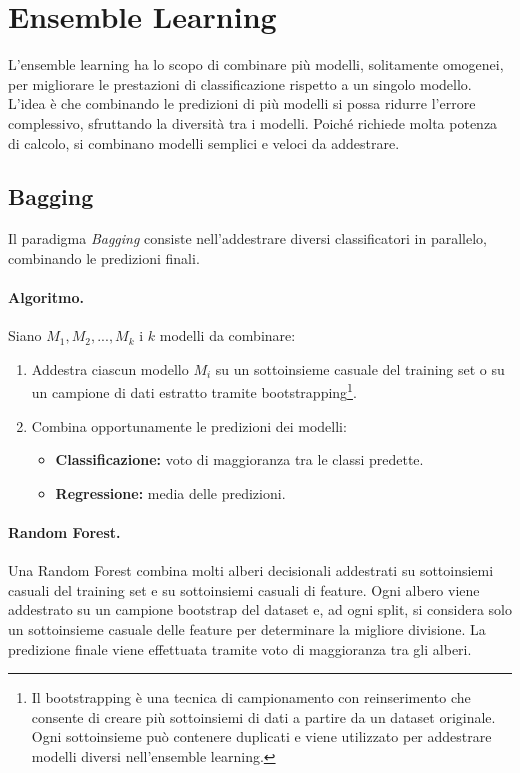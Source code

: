 \section{Ensemble Learning}\label{sec:ensemble}
L'ensemble learning ha lo scopo di combinare più modelli, solitamente omogenei, per migliorare le prestazioni di classificazione rispetto a un singolo modello. L'idea è che combinando le predizioni di più modelli si possa ridurre l'errore complessivo, sfruttando la diversità tra i modelli. Poiché richiede molta potenza di calcolo, si combinano modelli semplici e veloci da addestrare.

\subsection{Bagging}
Il paradigma \emph{Bagging} consiste nell'addestrare diversi classificatori in parallelo, combinando le predizioni finali.

\paragraph{Algoritmo.}
Siano $M_1, M_2, ..., M_k$ i $k$ modelli da combinare:
\begin{enumerate}
  \item Addestra ciascun modello $M_i$ su un sottoinsieme casuale del training set o su un campione di dati estratto tramite bootstrapping\footnote{Il bootstrapping è una tecnica di campionamento con reinserimento che consente di creare più sottoinsiemi di dati a partire da un dataset originale. Ogni sottoinsieme può contenere duplicati e viene utilizzato per addestrare modelli diversi nell'ensemble learning.}.
  \item Combina opportunamente le predizioni dei modelli:
  \begin{itemize}
    \item \textbf{Classificazione:} voto di maggioranza tra le classi predette.
    \item \textbf{Regressione:} media delle predizioni.
  \end{itemize}
\end{enumerate}

\paragraph{Random Forest.} Una Random Forest combina molti alberi decisionali addestrati su sottoinsiemi casuali del training set e su sottoinsiemi casuali di feature. Ogni albero viene addestrato su un campione bootstrap del dataset e, ad ogni split, si considera solo un sottoinsieme casuale delle feature per determinare la migliore divisione. La predizione finale viene effettuata tramite voto di maggioranza tra gli alberi.

